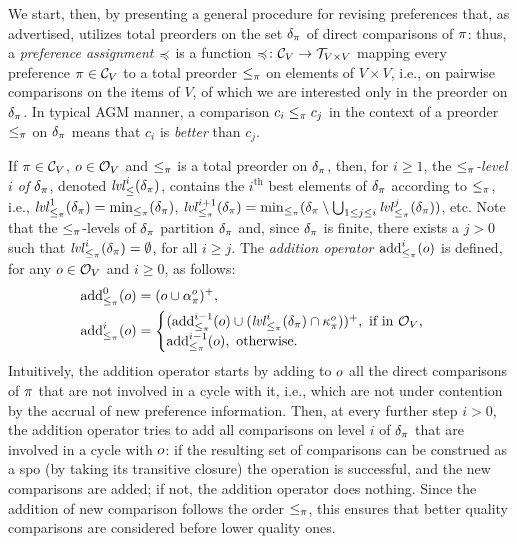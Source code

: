 We start, then, by presenting a general procedure for revising preferences that, as advertised,
utilizes total preorders on the set $\delta_\pi$ of direct comparisons of $\pi$:
thus, a \emph{preference assignment $\preccurlyeq$} is a function 
$\preccurlyeq\colon\mathcal{C}_V\rightarrow\mathcal{T}_{V\times V}$ mapping
every preference $\pi\in\mathcal{C}_V$ to a 
total preorder $\le_\pi$ on elements of $V\times V$, 
i.e., on pairwise comparisons on the items of $V$, 
of which we are interested only in the preorder on $\delta_\pi$.
In typical AGM manner, a comparison $c_i\le_\pi c_j$ 
in the context of a preorder $\le_\pi$ on $\delta_\pi$ means
that $c_i$ is \emph{better} than $c_j$.

If $\pi\in\mathcal{C}_V$, $o\in\mathcal{O}_V$ and $\le_\pi$ is a total preorder on 	$\delta_\pi$,
then, for $i\geq 1$, the \emph{$\le_\pi$-level $i$ of $\delta_\pi$}, denoted $\mathit{lvl}_\le^i(\delta_\pi)$,
contains the $i^\text{th}$ best elements of $\delta_\pi$ according to $\le_\pi$,
i.e., 
$\mathit{lvl}^1_{\le_\pi}(\delta_\pi)={\operatorname{min}}_{\le_\pi}(\delta_\pi)$,
$\mathit{lvl}^{i+1}_{\le_\pi}(\delta_\pi)={\operatorname{min}}_{\le_\pi}(\delta_\pi\setminus\bigcup_{1\leq j\leq i}\mathit{lvl}^j_{\le_\pi}(\delta_\pi))$, etc.
Note that the $\le_\pi$-levels of $\delta_\pi$ partition $\delta_\pi$ and, since $\delta_\pi$ is finite,
there exists a $j>0$ 
such that $\mathit{lvl}^i_{\le_\pi}(\delta_\pi)=\emptyset$, for all $i\ge j$.
The \emph{addition operator ${\operatorname{add}}^i_{\le_\pi}(o)$} is defined, 
for any $o\in\mathcal{O}_V$ and $i\geq 0$, as follows:
\begin{align*}
{\operatorname{add}}_{\le_\pi}^0(o) &= (o\cup\alpha_{\pi}^{o})^+,\\
{\operatorname{add}}_{\le_\pi}^i(o) &= 
\begin{cases}
({\operatorname{add}}^{i-1}_{\le_\pi}(o)\cup(\mathit{lvl}_{\le_\pi}^i(\delta_\pi)\cap\kappa_{\pi}^{o}))^+,~\text{if in}~\mathcal{O}_V,\\
{\operatorname{add}}_{\le_\pi}^{i-1}(o),~\text{otherwise}.
\end{cases}
\end{align*}
\noindent
Intuitively, the addition operator starts by adding to $o$ 
all the direct comparisons of $\pi$ that are not involved in a cycle with it,
i.e., which are not under contention by the accrual of new preference information.
Then, at every further step $i>0$, the addition operator 
tries to add all comparisons on level $i$ of $\delta_\pi$
that are involved in a cycle with $o$:
if the resulting set of comparisons can be construed as a spo 
(by taking its transitive closure) the operation is successful, and the new comparisons are added;
if not, the addition operator does nothing.
Since the addition of new comparison follows the order $\le_\pi$, this ensures
that better quality comparisons are considered before lower quality ones.

